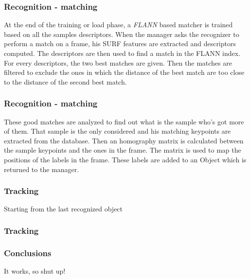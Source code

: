 \documentclass{beamer}
\begin{document}
	\begin{frame}
		\frametitle{Recognition - matching}
		At the end of the training or load phase, a \emph{FLANN} based matcher is trained based on all the samples descriptors.
		When the manager asks the recognizer to perform a match on a frame, his SURF features are extracted and descriptors computed. The descriptors are then used to find a match in the FLANN index.
		For every descriptors, the two best matches are given. Then the matches are filtered to exclude the ones in which the distance of the best match are too close to the distance of the second best match.
	\end{frame}

	\begin{frame}
		\frametitle{Recognition - matching}
		These good matches are analyzed to find out what is the sample who's got more of them. That sample is the only considered and his matching keypoints are extracted from the database.
		Then an homography matrix is calculated between the sample keypoints and the ones in the frame. The matrix is used to map the positions of the labels in the frame. These labels are added to an Object which is returned to the manager.
	\end{frame}

	\begin{frame}
		\frametitle{Tracking}
		Starting from the last recognized object
	\end{frame}

	\begin{frame}
		\frametitle{Tracking}
		
	\end{frame}

	\begin{frame}
		\frametitle{Conclusions}
		It works, so shut up!
	\end{frame}
\end{document}
